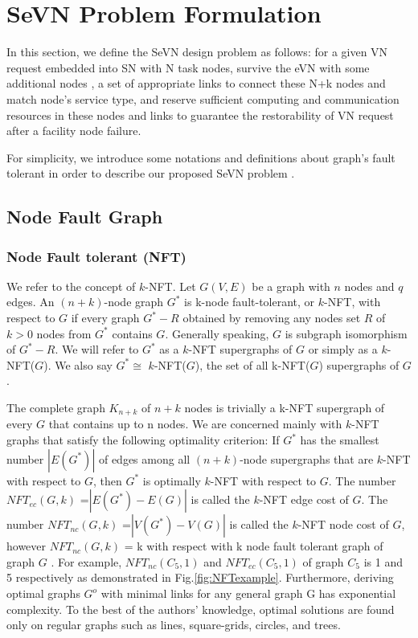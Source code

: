 
\section{SeVN Problem Formulation}
\label{sec:ProblemFormulation}
In this section, we define the SeVN design problem as follows: for a given VN request embedded into SN with N task nodes, survive the eVN with
some additional nodes , a set of appropriate links to connect these N+k nodes and match node's service type, and reserve sufficient computing and communication resources in these nodes and links to guarantee the restorability of VN request after a facility node failure.

For simplicity, we introduce some notations and definitions about graph's fault tolerant in order to describe our proposed SeVN problem .

\subsection{Node Fault Graph}
\subsubsection{Node Fault tolerant (NFT)}
We refer to the concept of $k$-NFT\cite{harary1996node}. Let $G(V,E)$ be a graph with $n$ nodes and $q$ edges. An $(n+k)$-node graph $G^*$ is k-node fault-tolerant, or $k$-NFT, with respect to $G$ if every graph $G^*-R$ obtained by removing any nodes set $R$ of $k>0$ nodes from $G^*$ contains $G$. Generally speaking, $G$ is subgraph isomorphism of $G^*-R$. We will refer to $G^*$ as a $k$-NFT supergraphs of $G$ or simply as a $k$-NFT($G$). We also say $G^*\cong$ $k$-NFT($G$), the set of all k-NFT($G$) supergraphs of $G$.

The complete graph $K_{n+k}$ of $n + k$ nodes is trivially a k-NFT supergraph of every $G$ that contains up to n nodes. We are concerned mainly with $k$-NFT graphs that satisfy the following optimality criterion: If $G^*$ has the smallest number $|E(G^*)|$ of edges among all $(n + k)$-node supergraphs that are $k$-NFT with respect to $G$, then $G^*$ is optimally $k$-NFT with respect to $G$. The number $NFT_{ec}$$(G,k)$ =$|E(G^*)-E(G)|$ is called the $k$-NFT edge cost of $G$. The number $NFT_{nc}$$(G,k)$ =$|V(G^*)-V(G)|$ is called the $k$-NFT node cost of $G$, however $NFT_{nc}$$(G,k)$ = k with respect with k node fault tolerant graph of graph $G$ . For example, $NFT_{nc}$$(C_5,1)$ and $NFT_{ec}$$(C_5,1)$ of graph $C_5$ is 1 and 5 respectively as demonstrated in Fig.\ref{fig:NFTexample}. Furthermore, deriving optimal graphs $G^o$ with minimal links for any general graph G has exponential complexity. To the best of the authors’ knowledge, optimal solutions are found only on regular graphs such as lines, square-grids, circles, and trees.

